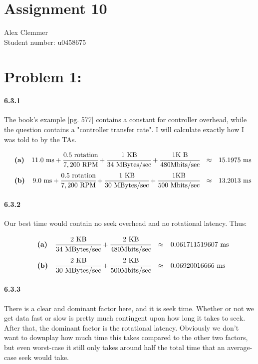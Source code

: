 \documentclass[a4paper]{article}
\begin{document}
\section*{Assignment 10}
Alex Clemmer\\
Student number: u0458675

\section*{Problem 1:}

\paragraph{6.3.1} The book's example [pg. 577] contains a constant for controller overhead, while the question contains a "controller transfer rate". I will calculate exactly how I was told to by the TAs.

\begin{equation}
\begin{array}{llrll}
& \textbf{(a)} & 11.0 \mbox{ ms} + \cfrac{0.5 \mbox{ rotation}}{7,200 \mbox{ RPM}} + \cfrac{1 \mbox{ KB}}{34 \mbox{ MBytes/sec}} + \cfrac{1 \mbox{K B}}{480 \mbox{Mbits/sec}} & \approx & 15.1975 \mbox{ ms} \\[.15in]
& \textbf{(b)} & 9.0 \mbox{ ms} + \cfrac{0.5 \mbox{ rotation}}{7,200 \mbox{ RPM}} + \cfrac{1 \mbox{ KB}}{30 \mbox{ MBytes/sec}} + \cfrac{1 \mbox{KB}}{500 \mbox{ Mbits/sec}} & \approx & 13.2013 \mbox{ ms}
\end{array}
\end{equation}

\paragraph{6.3.2}
Our best time would contain no seek overhead and no rotational latency. Thus:

\begin{equation}
\begin{array}{llrll}
& \textbf{(a)} & \cfrac{2 \mbox{ KB}}{34 \mbox{ MBytes/sec}} + \cfrac{2 \mbox{ KB}}{480 \mbox{Mbits/sec}} & \approx & 0.061711519607 \mbox{ ms} \\[.15in]
& \textbf{(b)} & \cfrac{2 \mbox{ KB}}{30 \mbox{ MBytes/sec}} + \cfrac{2 \mbox{ KB}}{500 \mbox{Mbits/sec}} & \approx & 0.06920016666 \mbox{ ms}
\end{array}
\end{equation}

\paragraph{6.3.3} There is a clear and dominant factor here, and it is seek time. Whether or not we get data fast or slow is pretty much contingent upon how long it takes to seek. After that, the dominant factor is the rotational latency. Obviously we don't want to downplay how much time this takes compared to the other two factors, but even worst-case it still only takes around half the total time that an average-case seek would take.
\end{document}
